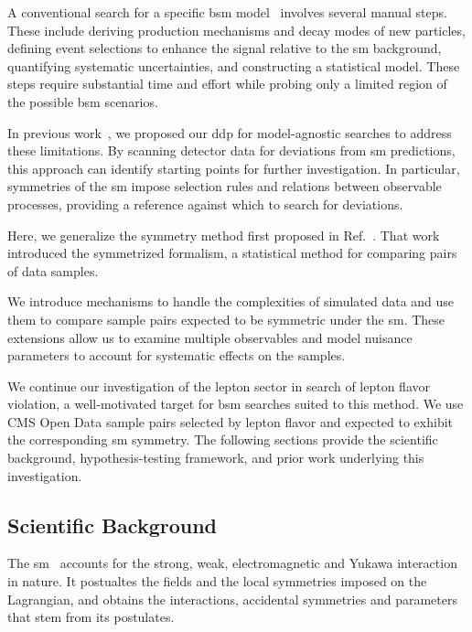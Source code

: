 \documentclass[thesis/Elad_Kliger_Thesis.tex]{subfiles}
\begin{document}
A conventional search for a specific \gls{bsm} model~\cite{ATLAS_Higgs_2012} involves several manual steps. These include deriving production mechanisms and decay modes of new particles, defining event selections to enhance the signal relative to the \gls{sm} background, quantifying systematic uncertainties, and constructing a statistical model. These steps require substantial time and effort while probing only a limited region of the possible \gls{bsm} scenarios.

In previous work~\cite{Volkovich_2022_DDP, Birman_2022_Symmetries, LastDDPPaper}, we proposed our \gls{ddp} for model-agnostic searches to address these limitations. By scanning detector data for deviations from \gls{sm} predictions, this approach can identify starting points for further investigation. In particular, symmetries of the \gls{sm} impose selection rules and relations between observable processes, providing a reference against which to search for deviations.

Here, we generalize the symmetry method first proposed in Ref.~\cite{LastDDPPaper}. That work introduced the symmetrized formalism, a statistical method for comparing pairs of data samples.

We introduce mechanisms to handle the complexities of simulated data and use them to compare sample pairs expected to be symmetric under the \gls{sm}. These extensions allow us to examine multiple observables and model nuisance parameters to account for systematic effects on the samples.

We continue our investigation of the lepton sector in search of lepton flavor violation, a well-motivated target for \gls{bsm} searches suited to this method. We use CMS Open Data sample pairs selected by lepton flavor and expected to exhibit the corresponding \gls{sm} symmetry. The following sections provide the scientific background, hypothesis-testing framework, and prior work underlying this investigation.

\subsection{Scientific Background}

The \gls{sm}~\cite{Grossman_StandardModel_2023} accounts for the strong, weak, electromagnetic and Yukawa interaction in nature. It postualtes the fields and the local symmetries imposed on the Lagrangian, and obtains the interactions, accidental symmetries and parameters that stem from its postulates.
\end{document}
